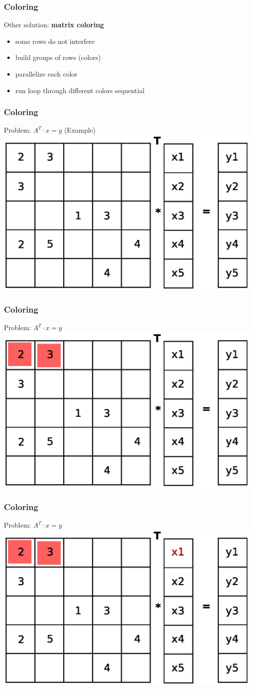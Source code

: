 \documentclass{beamer}
\begin{document}
\begin{frame}
\frametitle{Coloring}
Other solution: \textbf{matrix coloring}
\begin{itemize}
\item some rows do not interfere
\item build groups of rows (colors)
\item parallelize each color
\item run loop through different colors sequential
\end{itemize}
\end{frame}

\begin{frame}
\frametitle{Coloring}
Problem: $A^T \cdot x= y$
(Example)
\includegraphics[width=0.8\linewidth]{graphic/coloringT1.eps}
\end{frame}

\begin{frame}
\frametitle{Coloring}
Problem: $A^T \cdot x= y$
\includegraphics[width=0.8\linewidth]{graphic/coloringT2.eps}
\end{frame}

\begin{frame}
\frametitle{Coloring}
Problem: $A^T \cdot x= y$
\includegraphics[width=0.8\linewidth]{graphic/coloringT3.eps}
\end{frame}
\end{document}
